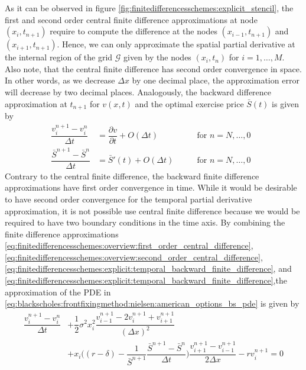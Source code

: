 As it can be observed in figure \eqref{fig:finitedifferencesschemes:explicit_stencil}, the first and second order central finite difference approximations at node $(x_i, t_{n+1})$ require to compute the difference at the nodes $(x_{i-1}, t_{n+1})$ and $(x_{i+1}, t_{n+1})$. Hence, we can only approximate the spatial partial derivative at the internal region of the grid $\mathcal{G}$ given by the nodes $(x_i, t_n)$ for $i=1,\dots,M$. Also note, that the central finite difference has second order convergence in space. In other words, as we decrease $\Delta{x}$ by one decimal place, the approximation error will decrease by two decimal places. Analogously, the backward difference approximation at $t_{n+1}$ for $v(x, t)$ and the optimal exercise price $\bar{S}(t)$ is given by
\begin{align}
  \label{eq:finitedifferencesschemes:explicit:temporal_backward_finite_difference}
  \dfrac{v^{n+1}_{i} - v^{n}_{i}}{\Delta{t}} &= \dfrac{\partial{v}}{\partial{t}}+ O(\Delta{t}) \qquad & \text{for $n = N,\dots,0$ } \\
  \label{eq:finitedifferencesschemes:explicit:front_temporal_backward_finite_difference}
  \dfrac{\bar{S}^{n+1}-\bar{S}^{n}}{\Delta t} &= \bar{S}'(t) + O(\Delta{t}) \qquad & \text{for $n = N,\dots,0$ }
\end{align}
Contrary to the central finite difference, the backward finite difference approximations have first order convergence in time. While it would be desirable to have second order convergence for the temporal partial derivative approximation, it is not possible use central finite difference because we would be required to have two boundary conditions in the time axis. By combining the finite difference approximations \eqref{eq:finitedifferencesschemes:overview:first_order_central_difference}, \eqref{eq:finitedifferencesschemes:overview:second_order_central_difference}, \eqref{eq:finitedifferencesschemes:explicit:temporal_backward_finite_difference}, and \eqref{eq:finitedifferencesschemes:explicit:temporal_backward_finite_difference},the approximation of the PDE in \eqref{eq:blackscholes:frontfixingmethod:nielsen:american_options_bs_pde} is given by 
\begin{equation*}
  \begin{split}
    \dfrac{v^{n+1}_{i} - v^{n}_{i}}{\Delta{t}} & + \dfrac{1}{2}\sigma^2 x_i^2 \dfrac{v^{n+1}_{i-1} - 2v^{n+1}_{i} + v^{n+1}_{i+1}}{(\Delta{x})^2} \\ 
     & + x_i\bigg( (r-\delta) - \dfrac{1}{\bar{S}^{n+1}}\dfrac{\bar{S}^{n+1} - \bar{S}^{n}}{\Delta{t}} \bigg)\dfrac{v^{n+1}_{i+1} - v^{n+1}_{i-1}}{2\Delta{x}} - rv^{n+1}_{i} = 0
  \end{split}
\end{equation*}
